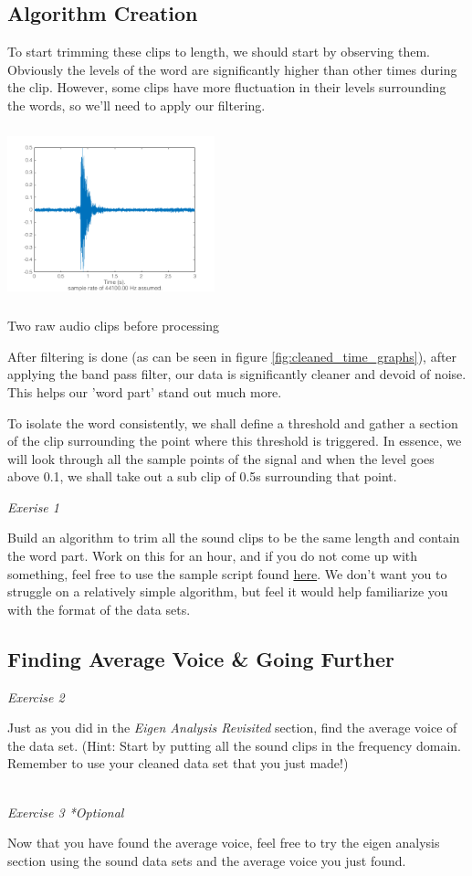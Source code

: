 \documentclass{tufte-handout}
\begin{document}
\subsection{Algorithm Creation}
To start trimming these clips to length, we should start by observing them. Obviously the levels of the word are significantly higher than other times during the clip. However, some clips have more fluctuation in their levels surrounding the words, so we'll need to apply our filtering.


\begin{marginfigure}
	\includegraphics[width = 6cm, height = 5cm]{cleaned_time_2.png}
	\caption{Two raw audio clips before processing}
	\label{fig:cleaned_time_graphs}
\end{marginfigure}
After filtering is done (as can be seen in figure \ref{fig:cleaned_time_graphs}), after applying the band pass filter, our data is significantly cleaner and devoid of noise. This helps our 'word part' stand out much more.

To isolate the word consistently, we shall define a threshold and gather a section of the clip surrounding the point where this threshold is triggered. In essence, we will look through all the sample points of the signal and when the level goes above 0.1, we shall take out a sub clip of 0.5s surrounding that point. 


\textit{Exerise 1}

Build an algorithm to trim all the sound clips to be the same length and contain the word part. Work on this for an hour, and if you do not come up with something, feel free to use the sample script found \href{#}{here}. We don't want you to struggle on a relatively simple algorithm, but feel it would help familiarize you with the format of the data sets. 

\subsection{Finding Average Voice & Going Further}
\textit{Exercise 2}

Just as you did in the \textit{Eigen Analysis Revisited} section, find the average voice of the data set. (Hint: Start by putting all the sound clips in the frequency domain. Remember to use your cleaned data set that you just made!)

\\
\textit{Exercise 3 *Optional}

Now that you have found the average voice, feel free to try the eigen analysis section using the sound data sets and the average voice you just found. 
\end{document}
